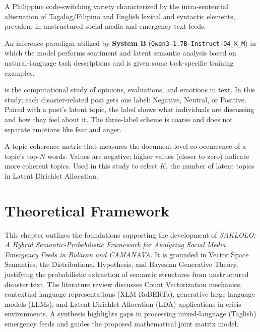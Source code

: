 \documentclass[12pt,a4paper]{report}
\newcommand{\sysB}{\textbf{System B}}
\newcommand{\qwen}{\texttt{Qwen3-1.7B-Instruct-Q4\_K\_M}}
\newcommand{\xlmr}{XLM-RoBERTa}
\begin{document}
\begin{description}[style=nextline,leftmargin=0pt]
  \item[Taglish.] A Philippine code-switching variety characterized by the
  intra-sentential alternation of Tagalog/Filipino and English lexical and
  syntactic elements, prevalent in unstructured social media and emergency
  text feeds.

  \item[Few-Shot Prompting.] An inference paradigm utilized by \sysB{}
  (\qwen) in which the model performs sentiment and latent semantic analysis
  based on natural-language task descriptions and is given some task-specific
  training examples.
  
  \item[Sentiment Analysis.]  is the computational study of opinions,
   evaluations, and emotions in text. In this study, each disaster-related 
   post gets one label: Negative, Neutral, or Positive. Paired with a post’s
   latent topic, the label shows what individuals are discussing and how 
   they feel about it. The three-label scheme is coarse and does not 
   separate emotions like fear and anger.
  
  

  \item[UMass Coherence.] A topic coherence metric that measures the
  document-level co-occurrence of a topic's top-$N$ words. Values are negative;
  higher values (closer to zero) indicate more coherent topics. Used in this
  study to select $K$, the number of latent topics in Latent Dirichlet
  Allocation.
\end{description}

\chapter{Theoretical Framework}

This chapter outlines the foundations supporting the development of
\emph{SAKLOLO: A Hybrid Semantic-Probabilistic Framework for Analysing Social
Media Emergency Feeds in Bulacan and CAMANAVA}. It is grounded in Vector Space
Semantics, the Distributional Hypothesis, and Bayesian Generative Theory,
justifying the probabilistic extraction of semantic structures from
unstructured disaster text. The literature review discusses Count
Vectorization mechanics, contextual language representations (\xlmr),
generative large language models (LLMs), and Latent Dirichlet Allocation (LDA)
applications in crisis environments. A synthesis highlights gaps in processing
mixed-language (Taglish) emergency feeds and guides the proposed mathematical
joint matrix model.
\end{document}
